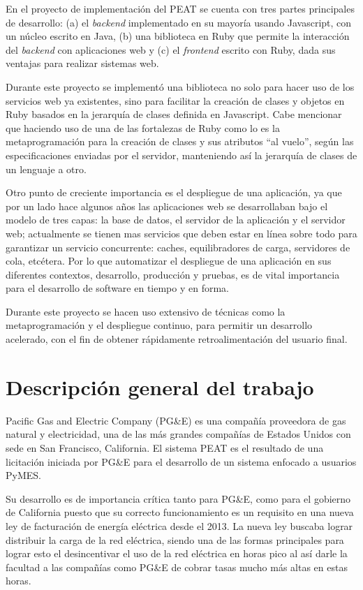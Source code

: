 \documentclass{article}
\begin{document}
En el proyecto de implementación del PEAT se cuenta con tres partes principales
de desarrollo: (a) el \textit{backend}  implementado en su mayoría usando
Javascript, con un núcleo escrito en Java, (b) una biblioteca en Ruby que permite
la interacción del \textit{backend} con aplicaciones web y (c) el \textit{frontend}
escrito con Ruby, dada sus ventajas para realizar sistemas web.

Durante este proyecto se implementó una biblioteca no solo para hacer uso de
los servicios web ya existentes, sino para facilitar la creación
de clases y objetos en Ruby basados en la jerarquía de clases definida
en Javascript. Cabe mencionar que haciendo uso de una de las fortalezas de Ruby
como lo es la metaprogramación para la creación de clases y sus
atributos ``al vuelo'', según las especificaciones enviadas por el servidor,
manteniendo así la jerarquía de clases de un lenguaje a otro.

Otro punto de creciente importancia es el despliegue de una aplicación, ya que por un
lado hace algunos años las aplicaciones web se desarrollaban bajo el modelo de
tres capas: la base de datos, el servidor de la aplicación y el servidor web; actualmente se tienen mas servicios
que deben estar en línea sobre todo para garantizar un servicio concurrente:
caches, equilibradores de carga, servidores de cola, etcétera. Por lo que
automatizar el despliegue de una aplicación en sus diferentes contextos,
desarrollo, producción y pruebas, es de vital importancia para el desarrollo
de software en tiempo y en forma.

Durante este proyecto se hacen uso extensivo de técnicas como la metaprogramación
y el despliegue continuo, para permitir un desarrollo acelerado, con el fin de
obtener rápidamente retroalimentación del usuario final.

\section{Descripción general del trabajo}
Pacific Gas and Electric Company (PG\&E) es una compañía proveedora de gas natural
y electricidad, una de las más grandes compañías de Estados Unidos con sede en
San Francisco, California. El sistema PEAT es el resultado de una licitación
iniciada por PG\&E para el desarrollo de un sistema enfocado a usuarios PyMES.

Su desarrollo es de importancia crítica tanto para PG\&E, como para el gobierno de
California puesto que su correcto funcionamiento es un requisito en una nueva
ley de facturación de energía eléctrica desde el 2013. La nueva ley buscaba
lograr distribuir la carga de la red eléctrica, siendo una de las formas
principales para lograr esto el desincentivar el uso de la red
eléctrica en horas pico al así darle la facultad a las compañías como PG\&E
de cobrar tasas mucho más altas en estas horas.
\end{document}

